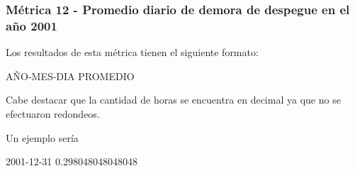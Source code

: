 \documentclass[a4paper,10pt]{article}
\begin{document}
        \subsubsection{Métrica 12 - Promedio diario de demora de despegue en el año 2001}
            Los resultados de esta métrica tienen el siguiente formato:\\
            \begin{center}
                AÑO-MES-DIA PROMEDIO
            \end{center}
            Cabe destacar que la cantidad de horas se encuentra en decimal ya que no se efectuaron redondeos.

            Un ejemplo sería\\
            \begin{center}
                2001-12-31  0.298048048048048\\
            \end{center}
\end{document}
